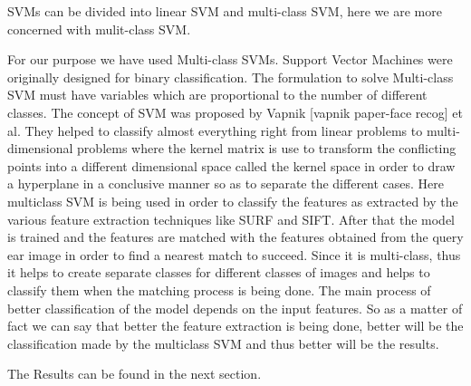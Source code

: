 SVMs can be divided into linear SVM and multi-class SVM, here we are more concerned with mulit-class SVM.

For our purpose we have used Multi-class SVMs. Support Vector Machines were originally designed for binary classification. The formulation to solve Multi-class SVM must have variables which are proportional to the number of different classes. The concept of SVM was proposed by Vapnik [vapnik paper-face recog] et al. They helped to classify almost everything right from linear problems to multi-dimensional problems where the kernel matrix is use to transform the conflicting points into a different dimensional space called the kernel space in order to draw a hyperplane in a conclusive manner so as to separate the different cases. Here multiclass SVM is being used in order to classify the features as extracted by the various feature extraction techniques like SURF and SIFT. After that the model is trained and the features are matched with the features obtained from the query ear image in order to find a nearest match to succeed. Since it is multi-class, thus it helps to create separate classes for different classes of images and helps to classify them when the matching process is being done. The main process of better classification of the model depends on the input features. So as a matter of fact we can say that better the feature extraction is being done, better will be the classification made by the multiclass SVM and thus better will be the results.

The Results can be found in the next section.

